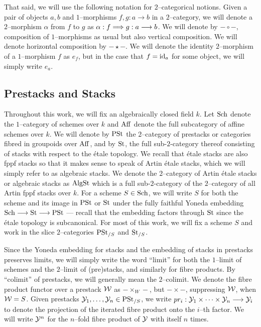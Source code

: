 \documentclass[11pt]{amsart}
\begin{document}
That said, we will use the following notation for $2$--categorical notions.
Given a pair of objects $a, b$ and $1$--morphisms $f, g : a \to b$ in a
$2$--category, we will denote a $2$--morphism $\alpha$ from $f$ to $g$ as
$\alpha : f \To g : a \to b$. We will denote by $- \circ -$, composition of
$1$--morphisms as usual but also vertical composition. We will denote
horizontal composition by $- \star -$. We will denote the identity $2$--morphism
of a $1$--morphism $f$ as $e_f$, but in the case that $f = \mathrm{id}_a$ for some
object, we will simply write $e_a$.

\subsection{Prestacks and Stacks}

Throughout this work, we will fix an algebraically closed field $k$.
Let $\mathrm{Sch}$ denote the $1$--category of schemes over $k$ and $\mathrm{Aff}$ denote the
full subcategory of affine schemes over $k$.
We will denote by $\mathrm{PSt}$ the $2$--category of
prestacks or categories fibred in groupoids over $\mathrm{Aff}$, and by
$\mathrm{St}$, the full sub-$2$-category thereof consisting of stacks with respect
to the \'etale topology.
We recall that \'etale stacks are also fppf stacks so that it
makes sense to speak of Artin \'etale stacks, which we will simply refer to as
algebraic stacks. We denote the $2$--category of Artin \'etale stacks
or algebraic stacks as $\mathrm{AlgSt}$ which is a full sub-$2$-category of the
$2$--category of all Artin fppf stacks over $k$.
For a scheme $S \in \mathrm{Sch}$, we will write $S$ for
both the scheme and its image in $\mathrm{PSt}$ or $\mathrm{St}$ under the fully faithful Yoneda
embedding $\Sch \to \St \to \PSt$ --- recall that the embedding factors through
$\mathrm{St}$ since the \'etale topology is subcanonical.
For most of this work, we will fix a scheme $S$ and work
in the slice $2$--categories $\mathrm{PSt}_{/S}$ and $\mathrm{St}_{/S}$.

Since the Yoneda embedding for stacks and the embedding of stacks in prestacks
preserves limits, we will simply write the word ``limit'' for both
the $1$--limit of schemes and the $2$--limit of (pre)stacks, and similarly for
fibre products. By ``colimit'' of prestacks, we will generally mean the
$2$--colimit. We denote the fibre product functor over a prestack $\mathcal{W}$ as
$- \times_W -$, but $- \times -$, suppressing $\mathcal{W}$, when $\mathcal{W} = S$.
Given prestacks $\mathcal{Y}_1, \dots, \mathcal{Y}_n \in \mathrm{PSt}_{/S}$, we write
$pr_i : \mcY_1 \times \cdots \times \mcY_n \to \mcY_i$ to denote the
projection of the iterated fibre product onto the $i$--th factor.
We will write $\mathcal{Y}^n$ for the $n$--fold fibre product of $\mathcal{Y}$ with itself $n$
times.
\end{document}
